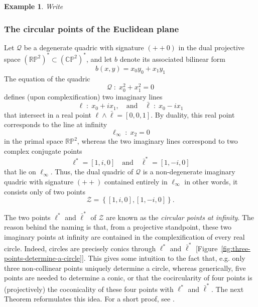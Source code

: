 \documentclass[10pt, a4paper]{article}
\theoremstyle{BoldTopSpacing}
\theoremstyle{BoldTopSpacing}
\theoremstyle{BoldTopSpacing}
\theoremstyle{BoldTopBottomSpacing}
\theoremstyle{BoldTopSpacing}
\theoremstyle{BoldTopBottomSpacing}
\newtheorem{example}{Example}[section]
\theoremstyle{remark}
\begin{document}
\begin{example}
\label{ex:hyperbolic-geometry}
Write
\end{example}

\subsubsection{The circular points of the Euclidean plane}
\label{subsubsec:circular-points-two-dimensional}

Let $\mathcal{Q}$ be a degenerate quadric with signature $(+ + 0)$ in the dual projective space $(\mathbb{R}\mathbb{P}^{2})^{*} \subset (\mathbb{C}\mathbb{P}^{2})^{*}$, and let $b$ denote its associated bilinear form
\[
    b(x, y) = x_{0}y_{0} + x_{1}y_{1}
\]
The equation of the quadric
\begin{equation*}
    \mathcal{Q} \; : \; x_{0}^2 + x_{1}^2 = 0
\end{equation*}
defines (upon complexification) two imaginary lines
\[
    \ell \; : \; x_{0} + i x_{1}, \quad \text{and} \quad \bar{\ell} \; : \; x_{0} - i x_{1}
\]
that intersect in a real point $\ell \wedge \bar{\ell} = [0, 0, 1]$. By duality, this real point corresponds to the line at infinity
\[
    \ell_{\infty} \; : \; x_{2} = 0
\]
in the primal space $\mathbb{R}\mathbb{P}^2$, whereas the two imaginary lines correspond to two complex conjugate points
\[
    \ell^{*} = [1, i, 0] \quad \text{and} \quad \bar{\ell}^{*} = [1, -i, 0]
\]
that lie on $\ell_{\infty}$. Thus, the dual quadric of $\mathcal{Q}$ is a non-degenerate imaginary quadric with signature $(+ +)$ contained entirely in $\ell_{\infty}$ \textemdash in other words, it consists only of two points
\begin{equation*}
    \mathcal{Z} = \left\{ [1, i, 0], [1, -i, 0] \right\}.
\end{equation*}

The two points $\ell^{*}$ and $\bar{\ell}^{*}$ of $\mathcal{Z}$ are known as the \textit{circular points at infinity}. The reason behind the naming is that, from a projective standpoint, these two imaginary points at infinity are contained in the complexification of every real circle. Indeed, circles are precisely conics through $\ell^{*}$ and $\bar{\ell}^{*}$ [Figure~\ref{fig:three-points-determine-a-circle}]. This gives some intuition to the fact that, e.g. only three non-collinear points uniquely determine a circle, whereas generically, five points are needed to determine a conic, or that the cocircularity of four points is (projectively) the coconicality of these four points with $\ell^{*}$ and $\bar{\ell}^{*}$. The next Theorem reformulates this idea. For a short proof, see \cite[\textcolor{CitationColor}{Proposition~9.9.}]{geometryII}. \par
\end{document}
